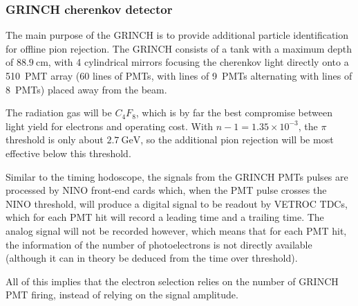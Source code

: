 \subsubsection{GRINCH cherenkov detector}

The main purpose of the GRINCH is to provide additional particle identification for offline pion rejection.
The GRINCH consists of a tank with a maximum depth of $88.9~\mathrm{cm}$, with 4 cylindrical mirrors focusing the cherenkov light directly onto a 510~PMT array (60 lines of PMTs, with lines of 9~PMTs alternating with lines of 8~PMTs) placed away from the beam.

The radiation gas will be $C_4F_8$, which is by far the best compromise between light yield for electrons and operating cost.
With $n-1=1.35\times10^{-3}$, the $\pi$ threshold is only about $2.7~\mathrm{GeV}$, so the additional pion rejection will be most effective below this threshold. 

Similar to the timing hodoscope, the signals from the GRINCH PMTs pulses are processed by NINO front-end cards which, when the PMT pulse crosses the NINO threshold, will produce a digital signal to be readout by VETROC TDCs, which for each PMT hit will record a leading time and a trailing time.
The analog signal will not be recorded however, which means that for each PMT hit, the information of the number of photoelectrons is not directly available (although it can in theory be deduced from the time over threshold).

All of this implies that the electron selection relies on the number of GRINCH PMT firing, instead of relying on the signal amplitude.
%
%



